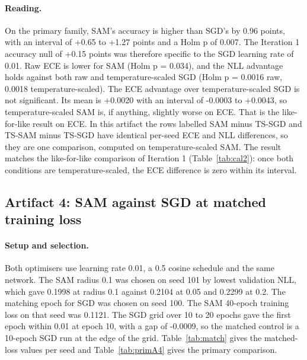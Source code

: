 \documentclass[11pt,letterpaper]{article}
\begin{document}
\paragraph{Reading.} On the primary family, SAM's accuracy is higher than SGD's by 0.96 points, with an interval of +0.65 to +1.27 points and a Holm p of 0.007. The Iteration 1 accuracy null of +0.15 points was therefore specific to the SGD learning rate of 0.01. Raw ECE is lower for SAM (Holm p = 0.034), and the NLL advantage holds against both raw and temperature-scaled SGD (Holm p = 0.0016 raw, 0.0018 temperature-scaled). The ECE advantage over temperature-scaled SGD is not significant. Its mean is +0.0020 with an interval of -0.0003 to +0.0043, so temperature-scaled SAM is, if anything, slightly worse on ECE. That is the like-for-like result on ECE. In this artifact the rows labelled SAM minus TS-SGD and TS-SAM minus TS-SGD have identical per-seed ECE and NLL differences, so they are one comparison, computed on temperature-scaled SAM. The result matches the like-for-like comparison of Iteration 1 (Table~\ref{tab:cal2}): once both conditions are temperature-scaled, the ECE difference is zero within its interval.

\subsection{Artifact 4: SAM against SGD at matched training loss}

\paragraph{Setup and selection.} Both optimisers use learning rate 0.01, a 0.5 cosine schedule and the same network. The SAM radius 0.1 was chosen on seed 101 by lowest validation NLL, which gave 0.1998 at radius 0.1 against 0.2104 at 0.05 and 0.2299 at 0.2. The matching epoch for SGD was chosen on seed 100. The SAM 40-epoch training loss on that seed was 0.1121. The SGD grid over 10 to 20 epochs gave the first epoch within 0.01 at epoch 10, with a gap of -0.0009, so the matched control is a 10-epoch SGD run at the edge of the grid. Table~\ref{tab:match} gives the matched-loss values per seed and Table~\ref{tab:primA4} gives the primary comparison.
\end{document}
